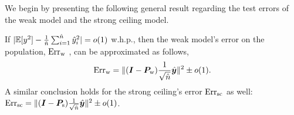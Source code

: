 We begin by presenting the following general result regarding the test errors of the weak model and the strong ceiling model.

\begin{lemma}\label{lemma: weak_error_population}
If $| \mathbb{E}[y^2]-\frac{1}{\hat{n}}\sum_{i=1}^{\hat{n}}\hat{y}_i^2  |=o(1)$ w.h.p., then
the weak model's error on the population, $\text{Err}_{\text{w}}$ , can be approximated as follows, 
\begin{align}
\nonumber
\text{Err}_{\text{w}} = \| ({\bm{I}} - {\bm{P}}_{\text{w}})\frac{1}{\sqrt{\hat{n}}}\hat{{\bm{y}}}  \|^2 \pm o(1).
\end{align}
A similar conclusion holds for the strong ceiling's error $\text{Err}_{\text{sc}}$ as well: $\text{Err}_{\text{sc}} = \| ({\bm{I}} - {\bm{P}}_{\text{s}})\frac{1}{\sqrt{\hat{n}}}\hat{{\bm{y}}}  \|^2 \pm o(1)$.
\end{lemma}
